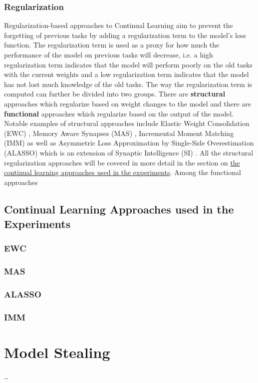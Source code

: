 \subsubsection{Regularization}
Regularization-based approaches to Continual Learning aim to prevent the forgetting of previous tasks by adding a regularization term to the model's loss function. The regularization term is used as a proxy for how much the
performance of the model on previous tasks will decrease, i.e. a high regularization term indicates that the model will perform poorly on the old tasks with the current weights and a low regularization term indicates that
the model has not lost much knowledge of the old tasks. The way the regularization term is computed can further be divided into two groups. There are \textbf{structural} approaches which regularize based on weight changes
to the model and there are \textbf{functional} approaches which regularize based on the output of the model. Notable examples of structural approaches include Elastic Weight Consolidation (EWC) \cite{mccloskey2016overcoming},
Memory Aware Synapses (MAS) \cite{aljundi2018memory}, Incremental Moment Matching (IMM) \cite{lee2017overcoming} as well as Asymmetric Loss Approximation by Single-Side Overestimation (ALASSO) \cite{park2019continual} which
is an extension of Synaptic Intelligence (SI) \cite{zenke2017continual}. All the structural regularization approaches will be covered in more detail in the section on
\href{sec:Related_work:Continual_Learning:Experiments}{the continual learning approaches used in the experiments}. Among the functional approaches 
\subsection{Continual Learning Approaches used in the Experiments}
\label{sec:Related_work:Continual_Learning:Experiments}
\subsubsection{EWC}
\subsubsection{MAS}
\subsubsection{ALASSO}
\subsubsection{IMM}



\section{Model Stealing}
\label{sec:Related_work:Model_Stealing}

\dots
